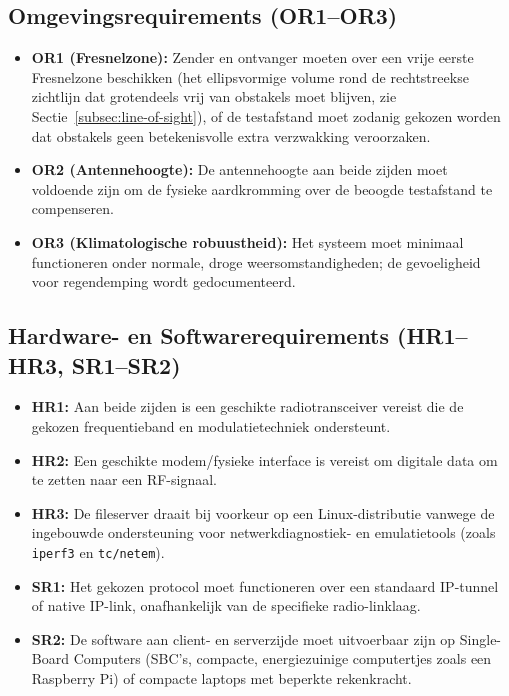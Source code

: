 \subsection{Omgevingsrequirements (OR1--OR3)}
\begin{itemize}
  \item \textbf{OR1 (Fresnelzone):} Zender en ontvanger moeten over een vrije eerste Fresnelzone beschikken (het ellipsvormige volume rond de rechtstreekse zichtlijn dat grotendeels vrij van obstakels moet blijven, zie Sectie~\ref{subsec:line-of-sight}), of de testafstand moet zodanig gekozen worden dat obstakels geen betekenisvolle extra verzwakking veroorzaken.
  \item \textbf{OR2 (Antennehoogte):} De antennehoogte aan beide zijden moet voldoende zijn om de fysieke aardkromming over de beoogde testafstand te compenseren.
  \item \textbf{OR3 (Klimatologische robuustheid):} Het systeem moet minimaal functioneren onder normale, droge weersomstandigheden; de gevoeligheid voor regendemping wordt gedocumenteerd.
\end{itemize}

\subsection{Hardware- en Softwarerequirements (HR1--HR3, SR1--SR2)}
\begin{itemize}
  \item \textbf{HR1:} Aan beide zijden is een geschikte radiotransceiver vereist die de gekozen frequentieband en modulatietechniek ondersteunt.
  \item \textbf{HR2:} Een geschikte modem/fysieke interface is vereist om digitale data om te zetten naar een RF-signaal.
  \item \textbf{HR3:} De fileserver draait bij voorkeur op een Linux-distributie vanwege de ingebouwde ondersteuning voor netwerkdiagnostiek- en emulatietools (zoals \texttt{iperf3} en \texttt{tc/netem}).
  \item \textbf{SR1:} Het gekozen protocol moet functioneren over een standaard IP-tunnel of native IP-link, onafhankelijk van de specifieke radio-linklaag.
  \item \textbf{SR2:} De software aan client- en serverzijde moet uitvoerbaar zijn op Single-Board Computers (SBC's, compacte, energiezuinige computertjes zoals een Raspberry Pi) of compacte laptops met beperkte rekenkracht.
\end{itemize}

